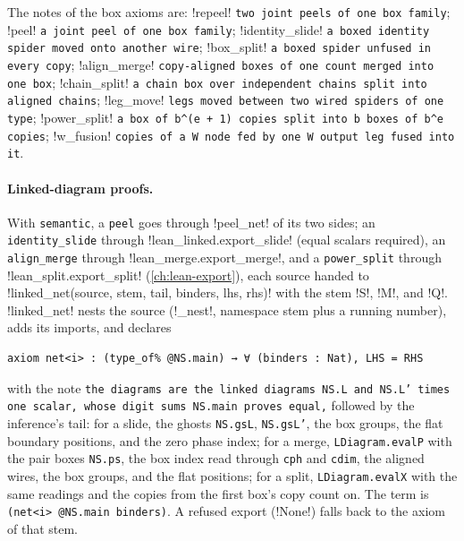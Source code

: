 The notes of the box axioms are: \code!repeel! \texttt{two joint peels of one box family}; \code!peel! \texttt{a joint peel of one box family}; \code!identity_slide! \texttt{a boxed identity spider moved onto another wire}; \code!box_split! \texttt{a boxed spider unfused in every copy}; \code!align_merge! \texttt{copy-aligned boxes of one count merged into one box}; \code!chain_split! \texttt{a chain box over independent chains split into aligned chains}; \code!leg_move! \texttt{legs moved between two wired spiders of one type}; \code!power_split! \texttt{a box of b\^{}(\allowbreak{}e + 1) copies split into b boxes of b\^{}e copies}; \code!w_fusion! \texttt{copies of a W node fed by one W output leg fused into it}.

\paragraph{Linked-diagram proofs.} With \texttt{semantic}, a \texttt{peel} goes through \py!peel_net! of its two sides; an \texttt{identity\_slide} through \py!lean_linked.export_slide! (equal scalars required), an \texttt{align\_merge} through \py!lean_merge.export_merge!, and a \texttt{power\_split} through \py!lean_split.export_split! (\cref{ch:lean-export}), each source handed to \py!linked_net(source, stem, tail, binders, lhs, rhs)! with the stem \code!S!, \code!M!, and \code!Q!. \py!linked_net! nests the source (\py!_nest!, namespace stem plus a running number), adds its imports, and declares
\begin{lstlisting}[style=lean]
axiom net<i> : (type_of% @NS.main) → ∀ (binders : Nat), LHS = RHS
\end{lstlisting}
with the note \texttt{the diagrams are the linked diagrams NS.L and NS.L' times one scalar, whose digit sums NS.main proves equal,} followed by the inference's tail: for a slide, the ghosts \texttt{NS.gsL}, \texttt{NS.gsL'}, the box groups, the flat boundary positions, and the zero phase index; for a merge, \texttt{LDiagram.evalP} with the pair boxes \texttt{NS.ps}, the box index read through \texttt{cph} and \texttt{cdim}, the aligned wires, the box groups, and the flat positions; for a split, \texttt{LDiagram.evalX} with the same readings and the copies from the first box's copy count on. The term is \texttt{(net<i> @NS.main binders)}. A refused export (\py!None!) falls back to the axiom of that stem.

